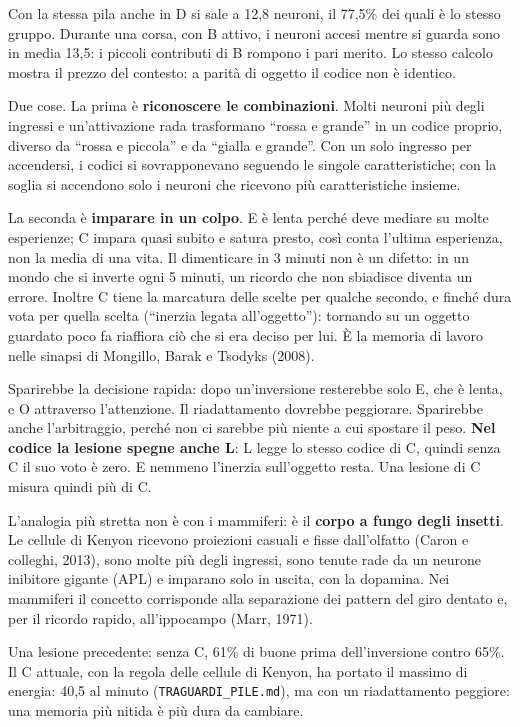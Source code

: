 \documentclass[11pt,a4paper]{article}
\newcommand{\voce}[1]{\par\smallskip\noindent{\bfseries\color{acc}#1}\par\nopagebreak}
\newcommand{\lesione}[1]{\textsf{\bfseries#1}}
\begin{document}
Con la stessa pila anche in D si sale a 12,8 neuroni, il 77,5\% dei quali è lo stesso gruppo. Durante
una corsa, con B attivo, i neuroni accesi mentre si guarda sono in media 13,5: i piccoli contributi di B
rompono i pari merito. Lo stesso calcolo mostra il prezzo del contesto: a parità di oggetto il codice
non è identico.

\voce{Perché serve}
Due cose. La prima è \textbf{riconoscere le combinazioni}. Molti neuroni più degli
ingressi e un'attivazione rada trasformano ``rossa e grande'' in un codice proprio,
diverso da ``rossa e piccola'' e da ``gialla e grande''. Con un solo ingresso per
accendersi, i codici si sovrapponevano seguendo le singole caratteristiche; con la
soglia si accendono solo i neuroni che ricevono più caratteristiche insieme.

La seconda è \textbf{imparare in un colpo}. E è lenta perché deve mediare su molte
esperienze; C impara quasi subito e satura presto, così conta l'ultima esperienza, non
la media di una vita. Il dimenticare in 3 minuti non è un difetto: in un mondo che si
inverte ogni 5 minuti, un ricordo che non sbiadisce diventa un errore. Inoltre C tiene
la marcatura delle scelte per qualche secondo, e finché dura vota per quella scelta
(``inerzia legata all'oggetto''): tornando su un oggetto guardato poco fa riaffiora ciò
che si era deciso per lui. È la memoria di lavoro nelle sinapsi di Mongillo, Barak e
Tsodyks (2008).

\voce{Se mancasse (lesione \lesione{C})}
Sparirebbe la decisione rapida: dopo un'inversione resterebbe solo E, che è lenta, e O
attraverso l'attenzione. Il riadattamento dovrebbe peggiorare. Sparirebbe anche
l'arbitraggio, perché non ci sarebbe più niente a cui spostare il peso. \textbf{Nel codice
la lesione spegne anche L}: L legge lo stesso codice di C, quindi senza C il suo voto è
zero. E nemmeno l'inerzia sull'oggetto resta. Una lesione di C misura quindi più di C.

\voce{Nel cervello}
L'analogia più stretta non è con i mammiferi: è il \textbf{corpo a fungo degli insetti}.
Le cellule di Kenyon ricevono proiezioni casuali e fisse dall'olfatto (Caron e colleghi,
2013), sono molte più degli ingressi, sono tenute rade da un neurone inibitore gigante
(APL) e imparano solo in uscita, con la dopamina. Nei mammiferi il concetto corrisponde
alla separazione dei pattern del giro dentato e, per il ricordo rapido, all'ippocampo
(Marr, 1971).

\voce{Misure}
Una lesione precedente: senza C, 61\% di buone prima dell'inversione contro 65\%. Il C
attuale, con la regola delle cellule di Kenyon, ha portato il massimo di energia: 40,5
al minuto (\texttt{TRAGUARDI\_PILE.md}), ma con un riadattamento peggiore: una memoria
più nitida è più dura da cambiare.
\end{document}
